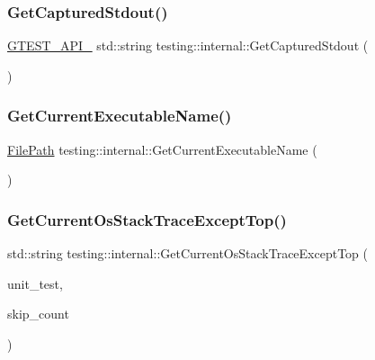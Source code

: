 \subsubsection{\texorpdfstring{Get\+Captured\+Stdout()}{GetCapturedStdout()}}
{\footnotesize\ttfamily \hyperlink{gtest-port_8h_aa73be6f0ba4a7456180a94904ce17790}{G\+T\+E\+S\+T\+\_\+\+A\+P\+I\+\_\+} std\+::string testing\+::internal\+::\+Get\+Captured\+Stdout (\begin{DoxyParamCaption}{ }\end{DoxyParamCaption})}

\mbox{\label{namespacetesting_1_1internal_a7a2bbf069f75bc99873976ad6fc356ad}} 
\subsubsection{\texorpdfstring{Get\+Current\+Executable\+Name()}{GetCurrentExecutableName()}}
{\footnotesize\ttfamily \hyperlink{classtesting_1_1internal_1_1_file_path}{File\+Path} testing\+::internal\+::\+Get\+Current\+Executable\+Name (\begin{DoxyParamCaption}{ }\end{DoxyParamCaption})}

\mbox{\label{namespacetesting_1_1internal_aeb475922b8cd1e6c60ac052bbc396e62}} 
\subsubsection{\texorpdfstring{Get\+Current\+Os\+Stack\+Trace\+Except\+Top()}{GetCurrentOsStackTraceExceptTop()}}
{\footnotesize\ttfamily std\+::string testing\+::internal\+::\+Get\+Current\+Os\+Stack\+Trace\+Except\+Top (\begin{DoxyParamCaption}\item[{\hyperlink{classtesting_1_1_unit_test}{Unit\+Test} $\ast$}]{unit\+\_\+test,  }\item[{int}]{skip\+\_\+count }\end{DoxyParamCaption})}

